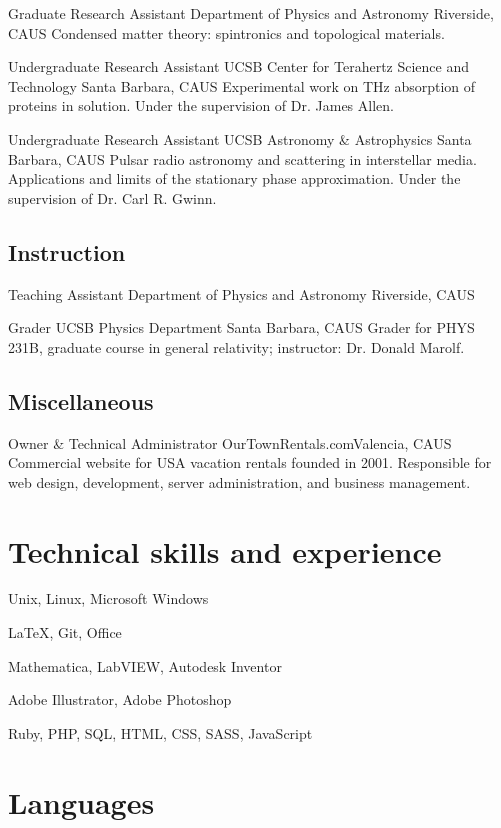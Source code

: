 \documentclass[12pt,letter]{moderncv}
\begin{document}
    {Graduate Research Assistant}
    {Department of Physics and Astronomy}
    {Riverside, CA}{US}
    {Condensed matter theory: spintronics and topological materials.}

    {Undergraduate Research Assistant}
    {UCSB Center for Terahertz Science and Technology}
    {Santa Barbara, CA}{US}
    {Experimental work on THz absorption of proteins in solution.
      Under the supervision  of Dr. James Allen.}

    {Undergraduate Research Assistant}
    {UCSB Astronomy \& Astrophysics}
    {Santa Barbara, CA}{US}
    {Pulsar radio astronomy and scattering in interstellar media.
      Applications and limits of the stationary phase approximation.
      Under the supervision of Dr. Carl R. Gwinn.}

  \subsection{Instruction}

    {Teaching Assistant}
    {Department of Physics and Astronomy}
    {Riverside, CA}{US}{}

    {Grader}
    {UCSB Physics Department}
    {Santa Barbara, CA}{US}
    {Grader for PHYS 231B, graduate course in general relativity; instructor: Dr. Donald Marolf.}

  \subsection{Miscellaneous}

    {Owner \& Technical Administrator}
    {OurTownRentals.com}{Valencia, CA}{US}
    {Commercial website for USA vacation rentals founded in 2001.
      Responsible for web design, development, server administration, and business management.}

  \section{Technical skills and experience}

    {Unix, Linux, Microsoft Windows}

    {\LaTeX, Git, Office}

    {Mathematica, LabVIEW, Autodesk Inventor}

    {Adobe Illustrator, Adobe Photoshop}

    {Ruby, PHP, SQL, HTML, CSS, SASS, JavaScript}

  \section{Languages}

\end{document}
